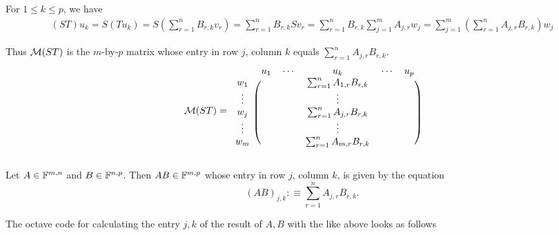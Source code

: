 For $1 \leq k \leq p$, we have
\begin{equation}
  \begin{aligned}
    (ST) u_k
    = S (Tu_k)
    = S \left ( \sum_{r=1}^{n} B_{r,k} v_r \right )
    =  \sum_{r=1}^{n} B_{r,k} S v_r
    =  \sum_{r=1}^{n} B_{r,k} \sum_{j=1}^{m} A_{j,r}  w_j
    =  \sum_{j=1}^{m} \left( \sum_{r=1}^{n} A_{j,r}  B_{r,k} \right) w_j
  \end{aligned}
\end{equation}

\begin{minipage}{\linewidth}
  Thus $\mathcal{M}(ST)$ is  the $m$-by-$p$ matrix whose entry in row $j$, column $k$ equals
  $\sum_{r=1}^{n} A_{j,r}  B_{r,k}.$
\begin{equation}
  \mathcal{M} (ST) =
  \begin{blockarray}{cccccc}
             & u_1 & \cdots &  u_k      & \cdots & u_p \\
    \begin{block}{c(ccccc)}
      w_1    &     &        &
        \sum_{r=1}^{n} A_{1,r}  B_{r,k} &        &     \\
      \vdots &     &        &  \vdots   &        &     \\
      w_j    &     &        &
        \sum_{r=1}^{n} A_{j,r}  B_{r,k} &        &     \\
      \vdots &     &        &  \vdots   &        &     \\
      w_m    &     &        &
        \sum_{r=1}^{n} A_{m,r}  B_{r,k} &        &     \\
    \end{block}
  \end{blockarray}
\end{equation}
\end{minipage}


\setcounter{thm}{40}
\begin{mydef} 
  \label{def: matrix multiplication}
  Let $A \in \mathbb{F}^{m,n}$ and $B \in \mathbb{F}^{n,p}$. Then $AB \in \mathbb{F}^{m,p}$ whose entry in row $j$, column $k$, is given by the equation
  \begin{equation}
    (AB)_{j,k} :\equiv \sum_{r=1}^{n} A_{j,r} B_{r,k}.
  \end{equation} %
  \begin{minipage}{\linewidth}
    The octave code for calculating the entry $j,k$ of the result of $A, B$ with the  like above looks as follows

  \end{minipage}
\end{mydef}

